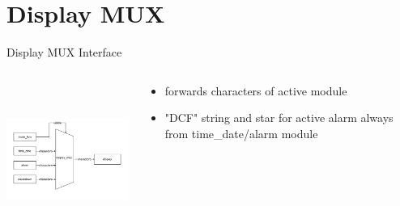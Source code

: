 \section{Display MUX}
\begin{frame}{Display MUX Interface}
    \begin{columns}
    \begin{column}{6cm}
        \includegraphics[width=60mm, height=50mm]{pictures/display_mux_interface.png}
    \end{column}
    \begin{column}{6cm}
    \begin{itemize}
        \item forwards characters of active module
        \item "DCF" string and star for active alarm always from time\_date/alarm module 
    \end {itemize}
    \end{column}
    \end{columns}
  \end{frame}
